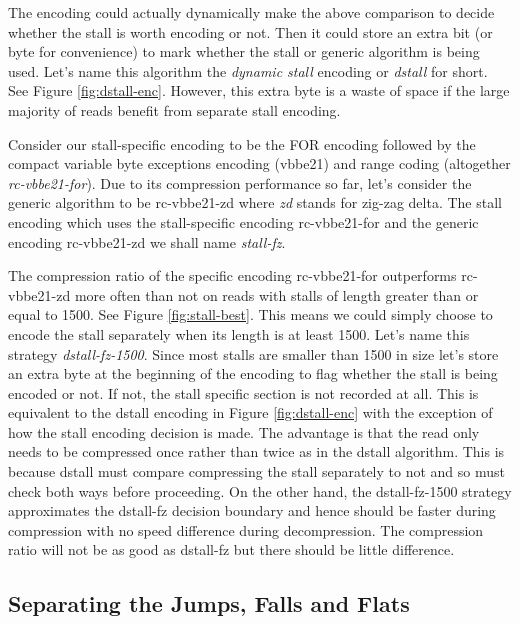 

The encoding could actually dynamically make the above comparison to decide
whether the stall is worth encoding or not. Then it could store an extra bit (or
byte for convenience) to mark whether the stall or generic algorithm is being
used. Let's name this algorithm the \textit{dynamic stall} encoding or
\textit{dstall} for short. See Figure \ref{fig:dstall-enc}. However, this extra
byte is a waste of space if the large majority of reads benefit from separate
stall encoding.



Consider our stall-specific encoding to be the FOR encoding followed by the
compact variable byte exceptions encoding (vbbe21) and range coding (altogether
\textit{rc-vbbe21-for}). Due to its compression performance so far, let's
consider the generic algorithm to be rc-vbbe21-zd where \textit{zd} stands for
zig-zag delta. The stall encoding which uses the stall-specific encoding
rc-vbbe21-for and the generic encoding rc-vbbe21-zd we shall name
\textit{stall-fz}.

The compression ratio of the specific encoding rc-vbbe21-for outperforms
rc-vbbe21-zd more often than not on reads with stalls of length greater than or
equal to 1500. See Figure \ref{fig:stall-best}. This means we could simply
choose to encode the stall separately when its length is at least 1500. Let's
name this strategy \textit{dstall-fz-1500}. Since most stalls are smaller than
1500 in size let's store an extra byte at the beginning of the encoding to flag
whether the stall is being encoded or not. If not, the stall specific section is
not recorded at all. This is equivalent to the dstall encoding in Figure
\ref{fig:dstall-enc} with the exception of how the stall encoding decision is
made. The advantage is that the read only needs to be compressed once rather
than twice as in the dstall algorithm. This is because dstall must compare
compressing the stall separately to not and so must check both ways before
proceeding. On the other hand, the dstall-fz-1500 strategy approximates the
dstall-fz decision boundary and hence should be faster during compression with
no speed difference during decompression. The compression ratio will not be as
good as dstall-fz but there should be little difference.

%


\subsection{Separating the Jumps, Falls and Flats}

